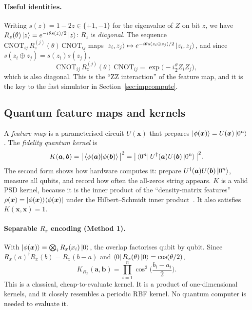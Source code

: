 \paragraph{Useful identities.}
Writing $s(z)=1-2z\in\{+1,-1\}$ for the eigenvalue of $Z$ on bit $z$, we have
$R_z(\theta)\left|z\right\rangle=e^{-i\theta s(z)/2}\left|z\right\rangle$: $R_z$ is \emph{diagonal}. The sequence
$\mathrm{CNOT}_{ij}\,R_z^{(j)}(\theta)\,\mathrm{CNOT}_{ij}$ maps
$\left|z_i,z_j\right\rangle\mapsto e^{-i\theta s(z_i\oplus z_j)/2}\left|z_i,z_j\right\rangle$, and since $s(z_i\oplus z_j)=s(z_i)s(z_j)$,
\begin{equation}
\mathrm{CNOT}_{ij}\,R_z^{(j)}(\theta)\,\mathrm{CNOT}_{ij}=\exp\!\big(-i\tfrac{\theta}{2}Z_i Z_j\big),
\label{eq:zzgate}
\end{equation}
which is also diagonal. This is the ``ZZ interaction'' of the feature map, and it is the key to the
fast simulator in Section~\ref{sec:impcompute}.

\subsection{Quantum feature maps and kernels}
A \emph{feature map} is a parameterised circuit $U(\bm{x})$ that prepares $\left|\phi(\bm x)\right\rangle=U(\bm x)\left|0^n\right\rangle$.
The \emph{fidelity quantum kernel} is
\begin{equation}
K(\bm a,\bm b)=\big|\left\langle\phi(\bm a)\middle|\phi(\bm b)\right\rangle\big|^2=\big|\left\langle0^n\right|U^\dagger(\bm a)U(\bm b)\left|0^n\right\rangle\big|^2 .
\label{eq:qkernel}
\end{equation}
The second form shows how hardware computes it: prepare $U^\dagger(\bm a)U(\bm b)\left|0^n\right\rangle$,
measure all qubits, and record how often the all-zeros string appears. $K$ is a valid PSD kernel,
because it is the inner product of the ``density-matrix features''
$\rho(\bm x)=\left|\phi(\bm x)\right\rangle\!\left\langle\phi(\bm x)\right|$ under the Hilbert--Schmidt inner product~\cite{schuld2019,schuld2021}.
It also satisfies $K(\bm x,\bm x)=1$.

\paragraph{Separable $R_x$ encoding (Method 1).} With $\left|\phi(\bm x)\right\rangle=\bigotimes_i R_x(x_i)\left|0\right\rangle$,
the overlap factorises qubit by qubit. Since $R_x(a)^\dagger R_x(b)=R_x(b-a)$ and
$\left\langle0\right|R_x(\theta)\left|0\right\rangle=\cos(\theta/2)$,
\begin{equation}
K_{R_x}(\bm a,\bm b)=\prod_{i=1}^n\cos^2\!\Big(\frac{b_i-a_i}{2}\Big).
\label{eq:rxkernel}
\end{equation}
This is a classical, cheap-to-evaluate kernel. It is a product of one-dimensional kernels, and
it closely resembles a periodic RBF kernel. No quantum computer is needed to evaluate it.

